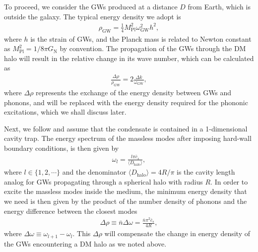 \documentclass[aps,prd,twocolumn,10pt,groupedaddress]{revtex4-1}
\begin{document}
To proceed, we consider the GWs produced at a distance $D$ from Earth, which is outside the galaxy. The typical energy density we adopt is
\begin{align}
\rho_\mathrm{GW}=\frac{1}{4}M_\mathrm{Pl}^{2}\omega_\mathrm{GW}^{2}h^{2},
\end{align}
where $h$ is the strain of GWs, and the Planck mass is related to Newton constant as $M_\mathrm{Pl}^{2}=1/8\pi G_\mathrm{N}$ by convention. The propagation of the GWs through the DM halo will result in the relative change in its wave number, which  can be calculated as
\begin{align}
\frac{\Delta\rho}{\rho_\mathrm{GW}}=2\frac{\Delta k}{\omega_\mathrm{GW}},
\end{align}
where $\Delta\rho$ represents the exchange of the energy density between GWs and phonons, and will be replaced with the energy density required for the phononic excitations, which we shall discuss later.

Next, we follow \cite{Sabin:2014bua} and assume that  the condensate is contained in a 1-dimensional cavity trap. The energy spectrum of the massless modes after imposing hard-wall boundary conditions, is then given by
\begin{align}
\omega_{l}=\frac{l\pi \bar{c}_{s}}{\langle D_{\mathrm{halo}}\rangle},
\end{align}
where $l\in \{1,2, \cdots\}$ and the denominator $\langle D_{\mathrm{halo}}\rangle=4R/\pi$ is the cavity length analog for GWs propagating through a spherical halo with radius $R$. In order to excite the massless modes inside the medium, the minimum energy density that we need is then given by the product of the number density of phonons and the energy difference between the closest modes
\begin{align}
\Delta \rho\equiv \bar{n}\Delta\omega=\frac{\bar{n}\pi^{2}\bar{c}_{s}}{4R},
\end{align}
where $\Delta\omega\equiv\omega_{l+1}-\omega_{l}$. This $\Delta \rho$ will compensate the change in energy density of the GWs encountering a DM halo as we noted above.
\end{document}

